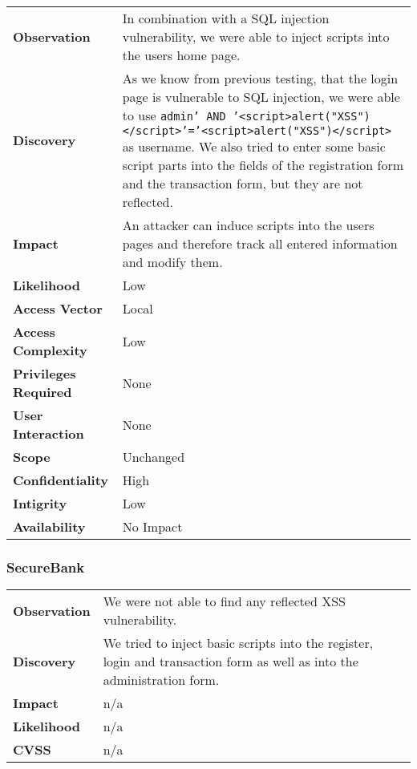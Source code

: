 \begin{tabular}{l|p{10cm}}

\textbf{Observation} & In combination with a SQL injection vulnerability, we were able to inject scripts into the users home page. \\
\textbf{Discovery} & As we know from previous testing, that the login page is vulnerable to SQL injection, we were able to use \texttt{admin' AND '<script>alert("XSS")</script>'='<script>alert("XSS")</script>} as username. We also tried to enter some basic script parts into the fields of the registration form and the transaction form, but they are not reflected. \\
\textbf{Impact} & An attacker can induce scripts into the users pages and therefore track all entered information and modify them. \\
\textbf{Likelihood} & Low \\
\textbf{Access Vector} & Local \\
\textbf{Access Complexity} & Low \\
\textbf{Privileges Required} & None \\
\textbf{User Interaction} & None \\
\textbf{Scope} & Unchanged \\
\textbf{Confidentiality} & High \\
\textbf{Intigrity} & Low \\
\textbf{Availability} & No Impact \\
\end{tabular}

\subsubsection*{SecureBank}

\begin{tabular}{l|p{10cm}}

\textbf{Observation} & We were not able to find any reflected XSS vulnerability. \\
\textbf{Discovery} & We tried to inject basic scripts into the register, login and transaction form as well as into the administration form.\\
\textbf{Impact} & n/a \\
\textbf{Likelihood} & n/a \\
\textbf{CVSS} & n/a \\
\end{tabular}



